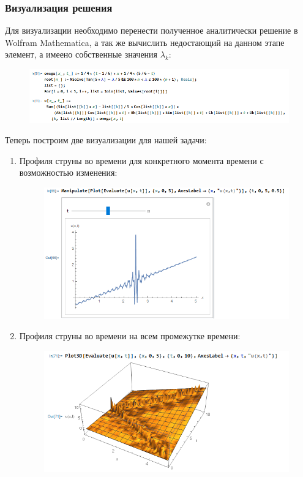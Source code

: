 \documentclass[11pt]{article}
\begin{document}
\subsubsection*{Визуализация решения}
Для визуализации необходимо перенести полученное аналитически решение в Wolfram Mathematica, а так же вычислить недостающий на данном этапе элемент, а имеено собственные значения $\lambda_k$:
\begin{figure}
    \centering
    \includegraphics[width=1\linewidth]{image3.png}
\end{figure}
Теперь построим две визуализации для нашей задачи:
\begin{enumerate}
    \item Профиля струны во времени для конкретного момента времени с возможностью
изменения:
        \begin{figure}
            \centering
            \includegraphics[width=1\linewidth]{image6.png}
        \end{figure}
    \item Профиля струны во времени на всем промежутке времени:
    \begin{figure}
        \centering
        \includegraphics[width=1\linewidth]{image7.png}
    \end{figure}
\end{enumerate}
\end{document}
